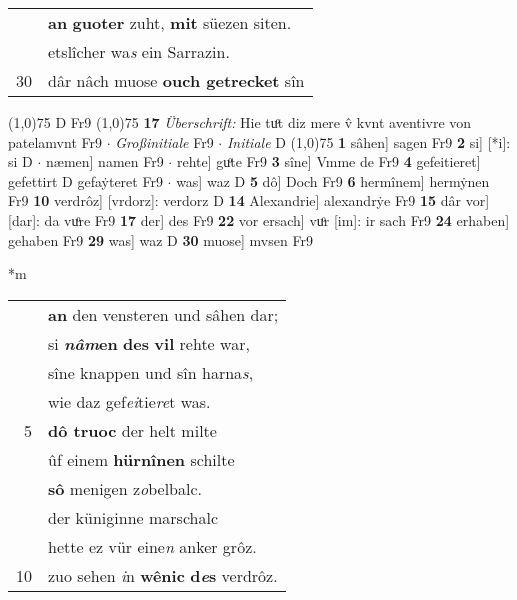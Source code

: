 \documentclass[8pt,a4paper,notitlepage]{article}
\begin{document}
\begin{table}[ht]
\begin{minipage}[t]{0.5\linewidth}
\begin{tabular}{rl}
 & \textbf{an} \textbf{guoter} zuht, \textbf{mit} süezen siten.\\ 
 & etslîcher wa\textit{s} ein Sarrazin.\\ 
30 & dâr nâch muose \textbf{ouch getrecket} sîn\\ 
\end{tabular}
\scriptsize
\line(1,0){75} \newline
D Fr9 \newline
\line(1,0){75} \newline
\textbf{17} \textit{Überschrift:} Hie tuͦt diz mere v̂ kvnt aventivre von patelamvnt Fr9   $\cdot$ \textit{Großinitiale} Fr9   $\cdot$ \textit{Initiale} D  \newline
\line(1,0){75} \newline
\textbf{1} sâhen] sagen Fr9 \textbf{2} si] [*i]: si D  $\cdot$ næmen] namen Fr9  $\cdot$ rehte] guͦte Fr9 \textbf{3} sîne] Vmme de Fr9 \textbf{4} gefeitieret] gefettirt D gefaẏteret Fr9  $\cdot$ was] waz D \textbf{5} dô] Doch Fr9 \textbf{6} hermînem] hermẏnen Fr9 \textbf{10} verdrôz] [vrdorz]: verdorz D \textbf{14} Alexandrie] alexandrẏe Fr9 \textbf{15} dâr vor] [dar]: da vuͦre Fr9 \textbf{17} der] des Fr9 \textbf{22} vor ersach] vuͦr [im]: ir sach Fr9 \textbf{24} erhaben] gehaben Fr9 \textbf{29} was] waz D \textbf{30} muose] mvsen Fr9 \newline
\end{minipage}
\hspace{0.5cm}
\begin{minipage}[t]{0.5\linewidth}
\small
\begin{center}*m
\end{center}
\begin{tabular}{rl}
 & \textbf{an} den vensteren und sâhen dar;\\ 
 & si \textbf{\textit{nâm}en} \textbf{des} \textbf{vil} rehte war,\\ 
 & sîne knappen und sîn harna\textit{s},\\ 
 & wie daz gef\textit{ei}tie\textit{re}t was.\\ 
5 & \textbf{dô truoc} der helt milte\\ 
 & ûf einem \textbf{hürnînen} schilte\\ 
 & \textbf{sô} menigen z\textit{o}belbalc.\\ 
 & der küniginne marschalc\\ 
 & hette ez vür eine\textit{n} anker grôz.\\ 
10 & zuo sehen \textit{i}n \textbf{wênic} \textbf{d\textit{e}s} verdrôz.\\ 

\end{tabular}
\end{minipage}
\end{table}
\end{document}
